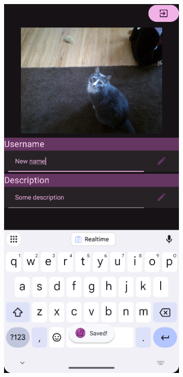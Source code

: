 \documentclass{report}
\begin{document}
\begin{figure}[h]
    \centering
    \begin{subfigure}[b]{0.32\textwidth}
        \includegraphics[width=\textwidth]{DEMO_Acc2.png}

\end{subfigure}
\end{figure}
\end{document}
